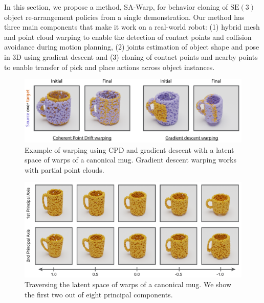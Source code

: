 \documentclass{article}
\begin{document}
\begin{algorithm}[H]
\begin{algorithmic}[1]
\end{algorithmic}

\end{algorithm}

In this section, we propose a method, SA-Warp, for behavior cloning of $\mathrm{SE(3)}$ object re-arrangement policies from a single demonstration. Our method has three main components that make it work on a real-world robot: (1) hybrid mesh and point cloud warping to enable the detection of contact points and collision avoidance during motion planning, (2) joints estimation of object shape and pose in 3D using gradient descent and (3) cloning of contact points and nearby points to enable transfer of pick and place actions across object instances.

\begin{figure}
    \centering
    \includegraphics[width=\textwidth]{figures/warping.pdf}
    \caption{Example of warping using CPD and gradient descent with a latent space of warps of a canonical mug. Gradient descent warping works with partial point clouds.}
    \label{fig:latent}
\end{figure}

\begin{figure}
    \centering
    \includegraphics[width=\textwidth]{figures/latent_mugs.pdf}
    \caption{Traversing the latent space of warps of a canonical mug. We show the first two out of eight principal components.}
    \label{fig:latent}
\end{figure}
\end{document}

